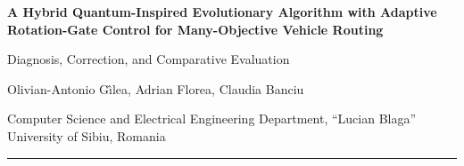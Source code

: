 \documentclass{article}
\newcommand{\bodyfont}{\fontsize{28}{37}\selectfont}
\begin{document}
\bodyfont

\begin{center}
  {\fontsize{64}{77}\selectfont\bfseries
   A Hybrid Quantum-Inspired Evolutionary Algorithm with Adaptive\\
   Rotation-Gate Control for Many-Objective Vehicle Routing\par}
  \vspace{12mm}
  {\fontsize{50}{60}\selectfont Diagnosis, Correction, and Comparative Evaluation\par}
  \vspace{14mm}
  {\fontsize{38}{46}\selectfont Olivian-Antonio G\^{\i}lea, Adrian Florea, Claudia Banciu\par}
  \vspace{6mm}
  {\fontsize{30}{38}\selectfont\color{muted} Computer Science and Electrical Engineering Department,
   ``Lucian Blaga'' University of Sibiu, Romania\par}
\end{center}
\vspace{10mm}
{\color{rulegray}\rule{\textwidth}{2mm}}
\vspace{16mm}
\end{document}
